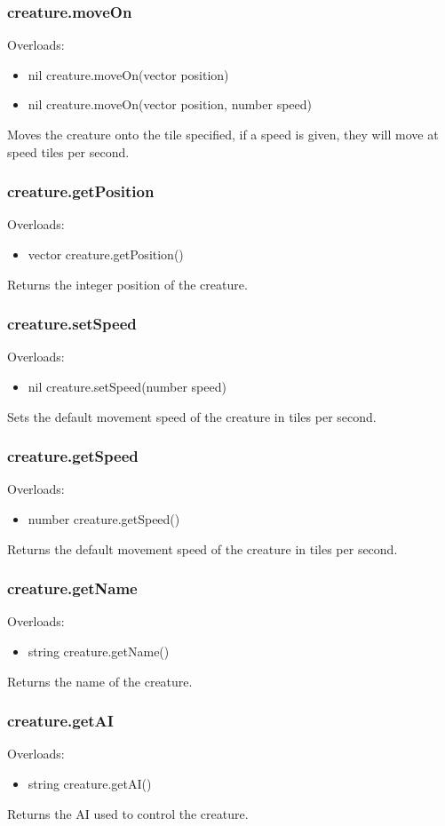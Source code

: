 \documentclass{book}
\newenvironment{ulist}
	{\begin{itemize}
			\itemsep0em}
	{\end{itemize}}
\begin{document}
\subsubsection{creature.moveOn}
Overloads:
\begin{ulist}
	\item nil creature.moveOn(vector position)
	\item nil creature.moveOn(vector position, number speed)
\end{ulist}
Moves the creature onto the tile specified, if a speed is given, they will move at speed tiles per second.

\subsubsection{creature.getPosition}
Overloads:
\begin{ulist}
	\item vector creature.getPosition()
\end{ulist}
Returns the integer position of the creature.

\subsubsection{creature.setSpeed}
Overloads:
\begin{ulist}
	\item nil creature.setSpeed(number speed)
\end{ulist}
Sets the default movement speed of the creature in tiles per second.

\subsubsection{creature.getSpeed}
Overloads:
\begin{ulist}
	\item number creature.getSpeed()
\end{ulist}
Returns the default movement speed of the creature in tiles per second.

\subsubsection{creature.getName}
Overloads:
\begin{ulist}
	\item string creature.getName()
\end{ulist}
Returns the name of the creature.

\subsubsection{creature.getAI}
Overloads:
\begin{ulist}
	\item string creature.getAI()
\end{ulist}
Returns the AI used to control the creature.
\end{document}
